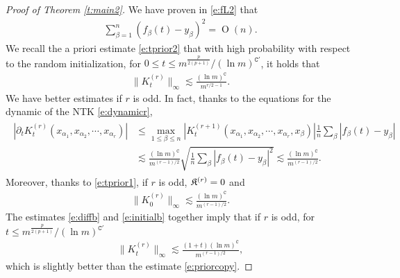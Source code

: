 \documentclass{article}
\numberwithin{equation}{section}
\newcommand{\fC}{{\mathtt C}}
\newcommand{\fK}{{\frak K}}
\newcommand{\al}{\alpha}
\DeclareMathOperator{\OO}{O}
\renewcommand{\leq}{\leqslant}
\newcommand{\del}{\partial}
\newcommand{\1}{\mathds{1}}
\theoremstyle{plain} %
\begin{document}
\begin{proof}[Proof of Theorem \ref{t:main2}]
We have proven in \eqref{e:fL2} that 
\begin{align}\label{e:ftL2}
\sum_{\beta=1}^n (f_\beta(t)-y_\beta)^2=\OO(n).
\end{align}
We recall the a priori estimate \eqref{e:tprior2} that with high probability with respect to the random initialization, for $0\leq t\leq m^{\frac{p}{2(p+1)}}/(\ln m)^{\fC'}$, it holds that 
\begin{align}\label{e:priorcopy}
\|K_t^{(r)}\|_{\infty}\lesssim \frac{(\ln m)^{\fC}}{m^{r/2-1}}.
\end{align}
We have better estimates if $r$ is odd. In fact, thanks to the equations for the dynamic of the NTK \eqref{e:dynamicr},
\begin{align}\begin{split}\label{e:diffb}
\left|\del_tK_t^{(r)}(x_{\al_1},x_{\al_2},\cdots, x_{\al_r})\right|
&\leq \max_{1\leq \beta \leq n}|K^{(r+1)}_t(x_{\al_1}, x_{\al_2}, \cdots, x_{\alpha_r}, x_\beta)|\frac{1}{n} \sum_{\beta} |f_\beta(t)-y_\beta|\\
&\lesssim \frac{(\ln m)^{\fC}}{m^{(r-1)/2}}\sqrt{\frac{1}{n} \sum_{\beta} |f_\beta(t)-y_\beta|^2}\lesssim \frac{(\ln m)^{\fC}}{m^{(r-1)/2}}.
\end{split}\end{align}
Moreover, thanks to \eqref{e:tprior1}, if $r$ is odd, $\fK^{(r)}=0$ and 
\begin{align}\label{e:initialb}
\|K_0^{(r)}\|_{\infty}\lesssim \frac{(\ln m)^{\fC}}{m^{(r-1)/2}}.
\end{align}
The estimates \eqref{e:diffb} and \eqref{e:initialb} together imply that if $r$ is odd, for $t\leq m^{\frac{p}{2(p+1)}}/(\ln m)^{\fC'}$
\begin{align}\label{e:roddbound}
\|K_t^{(r)}\|_{\infty}\lesssim \frac{(1+t)(\ln m)^{\fC}}{m^{(r-1)/2}},
\end{align}
which is slightly better than the estimate \eqref{e:priorcopy}.
%
%
%
%

\end{proof}
\end{document}
